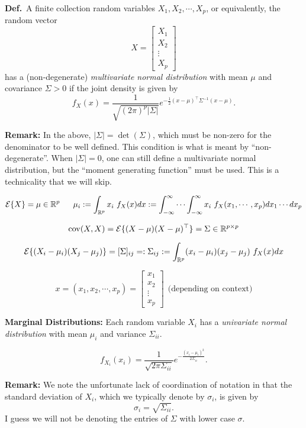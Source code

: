 \documentclass[letterpaper]{article}
\newcommand{\real}{\mathbb R}  %
\newcommand{\cov}{\mathrm{cov}}
\begin{document}
\newpage

\noindent \textbf{Def.}~A finite collection random variables $X_1, X_2, \cdots, X_p$, or equivalently, the random vector
 $$ X = \begin{bmatrix} X_1 \\ X_2 \\ \vdots \\ X_p  \end{bmatrix}$$
 has a (non-degenerate) \textit{multivariate normal distribution} with mean $\mu$ and covariance $\Sigma>0$ if the joint density is given by
$$f_X(x) = \frac{1}{\sqrt{(2 \pi)^{p} |\Sigma| }} e^{ -\frac{1}{2} (x-\mu)^\top \Sigma^{-1}(x-\mu) }.$$

\noindent \textbf{Remark:} In the above, $|\Sigma| = \det(\Sigma)$, which must be non-zero for the denominator to be well defined. This condition is what is meant by ``non-degenerate''. When $|\Sigma|=0$, one can still define a multivariate normal distribution, but the ``moment generating function'' must be used. This is a technicality that we will skip.

$${\cal E} \{ X\} = \mu \in \real^p~~~~~\mu_i:= \int_{\real^p} x_i ~f_X(x) dx := \int_{-\infty}^{\infty} \cdots \int_{-\infty}^{\infty}x_i ~ f_X(x_1,\cdots, x_p) dx_1 \cdots dx_p$$

$$\cov(X,X)={\cal E} \{ (X-\mu) (X-\mu)^\top \} =\Sigma \in \real^{p \times p}$$

$${\cal E} \{ (X_i-\mu_i) (X_j-\mu_j)\} =[\Sigma]_{ij}=:\Sigma_{ij} := \int_{\real^p} (x_i-\mu_i)(x_j - \mu_j) ~f_X(x) dx $$

$$x  = (x_1, x_2, \cdots, x_p) = \begin{bmatrix} x_1 \\ x_2 \\ \vdots\\ x_p \end{bmatrix}~~\mbox{(depending on context)}$$


\noindent \textbf{Marginal Distributions:} Each random variable $X_i$ has a \textit{univariate normal distribution} with mean $\mu_i$ and variance $\Sigma_{ii}$.

$$ f_{X_i}(x_i) = \frac{1}{ \sqrt{2 \pi \Sigma_{ii} }} e^{-\frac{(x_i-\mu_i)^2}{2 \Sigma_{ii}}}.$$

\noindent \textbf{Remark:} We note the unfortunate lack of coordination of notation in that the standard deviation of $X_i$, which we typically denote by $\sigma_i$,  is given by
$$\sigma_i = \sqrt{\Sigma_{ii}}. $$
I guess we will not be denoting the entries of $\Sigma$ with lower case $\sigma$.
\end{document}
